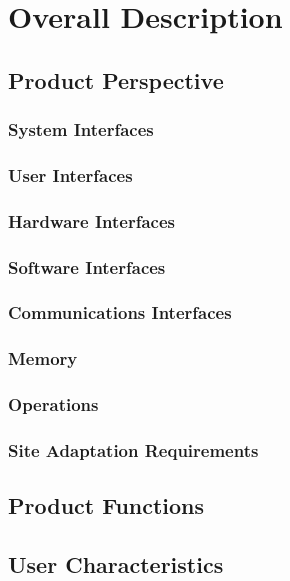 \chapter{Overall Description} \label{chap2}

\section{Product Perspective}

\subsection{System Interfaces}

\subsection{User Interfaces}

\subsection{Hardware Interfaces}

\subsection{Software Interfaces}

\subsection{Communications Interfaces}

\subsection{Memory}

\subsection{Operations}

\subsection{Site Adaptation Requirements}

\section{Product Functions}

\section{User Characteristics}

